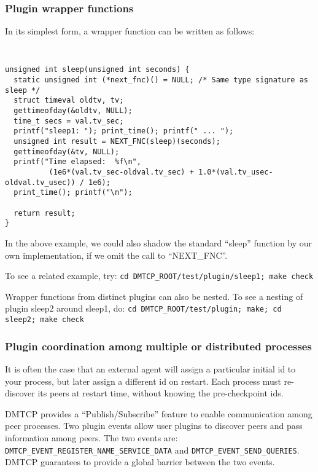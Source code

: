 \documentclass{article}
\begin{document}
\subsubsection{Plugin wrapper functions}
\label{sec:wrappers}

In its simplest form, a wrapper function can be written as follows:

{\tt
\begin{verbatim}
unsigned int sleep(unsigned int seconds) {
  static unsigned int (*next_fnc)() = NULL; /* Same type signature as sleep */
  struct timeval oldtv, tv;
  gettimeofday(&oldtv, NULL);
  time_t secs = val.tv_sec;
  printf("sleep1: "); print_time(); printf(" ... ");
  unsigned int result = NEXT_FNC(sleep)(seconds);
  gettimeofday(&tv, NULL);
  printf("Time elapsed:  %f\n",
          (1e6*(val.tv_sec-oldval.tv_sec) + 1.0*(val.tv_usec-oldval.tv_usec)) / 1e6);
  print_time(); printf("\n");

  return result;
}
\end{verbatim}
}

In the above example, we could also shadow the standard ``sleep'' function
by our own implementation, if we omit the call to ``{NEXT\_FNC}''.

\noindent
To see a related example, try:
\hfill\break
\medskip\noindent
  \hspace{0.3truein} {\tt cd DMTCP\_ROOT/test/plugin/sleep1; make check}
\medskip

\noindent
Wrapper functions from distinct plugins can also be nested.  To see a nesting
of plugin sleep2 around sleep1, do:
\hfill\break
\medskip\noindent
  \hspace{0.3truein} {\tt cd DMTCP\_ROOT/test/plugin; make; cd sleep2; make check}
\medskip


\subsubsection{Plugin coordination among multiple or distributed processes}
\label{sec:publishSubscribe}

It is often the case that an external agent will assign a particular
initial id to your process, but later assign a different id on restart.
Each process must re-discover its peers at restart time, without knowing
the pre-checkpoint ids.

DMTCP provides a ``Publish/Subscribe'' feature to enable communication among
peer processes. Two plugin events allow user
plugins to discover peers and pass information among peers.
The two events are:  {\tt DMTCP\_EVENT\_REGISTER\_NAME\_SERVICE\_DATA}
and {\tt DMTCP\_EVENT\_SEND\_QUERIES}.  DMTCP guarantees to provide a global
barrier between the two events.
\end{document}
